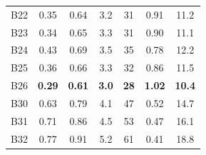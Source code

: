 \documentclass{article}
\theoremstyle{plain}
\theoremstyle{definition}
\theoremstyle{remark}
\begin{document}
\begin{table}[h!]
{\begin{tabular}{lcccccc}
      B22                              &
      0.35                             &
      0.64                             &
      3.2                              &
      31                               &
      0.91                             &
      11.2                               \\

      B23                              &
      0.34                             &
      0.65                             &
      3.3                              &
      31                               &
      0.90                             &
      11.1                               \\

      B24                              &
      0.43                             &
      0.69                             &
      3.5                              &
      35                               &
      0.78                             &
      12.2                               \\

      B25                              &
      0.36                             &
      0.66                             &
      3.3                              &
      32                               &
      0.86                             &
      11.5                               \\

      B26                              &
      \textbf{0.29}                    &
      \textbf{0.61}                    &
      \textbf{3.0}                     &
      \textbf{28}                      &
      \textbf{1.02}                    &
      \textbf{10.4}                      \\

      B30                              &
      0.63                             &
      0.79                             &
      4.1                              &
      47                               &
      0.52                             &
      14.7                               \\

      B31                              &
      0.71                             &
      0.86                             &
      4.5                              &
      53                               &
      0.47                             &
      16.1                               \\

      B32                              &
      0.77                             &
      0.91                             &
      5.2                              &
      61                               &
      0.41                             &
      18.8                               \\


\end{tabular}}
\end{table}
\end{document}
